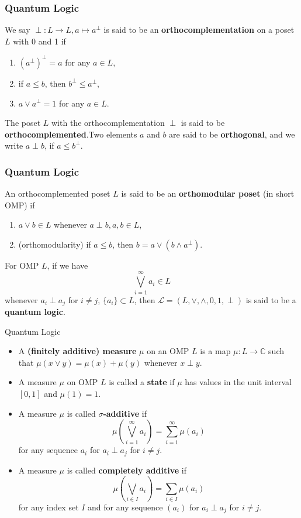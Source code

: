 \documentclass{beamer}
\begin{document}
\begin{frame}
    \frametitle{Quantum Logic}
We say \(\perp: L \to L, a \mapsto a^\perp \) is said to be an \textbf{orthocomplementation} on a poset \(L\) with 0 and 1 if
\begin{enumerate}
    \item \((a^\perp)^\perp = a\) for any \(a \in L\),\pause\\
    \item if \(a \le b\), then \(b^\perp \le a^\perp \),\pause
    \item \(a \vee a^\perp=1\) for any \(a\in L\).\pause
\end{enumerate}
The poset \(L\) with the orthocomplementation \(\perp\) is said to be \textbf{orthocomplemented}.\pause Two elements \(a\) and \(b\) are said to be \textbf{orthogonal}, and we write \(a\perp b\), if \(a\le b^\perp\).


\end{frame}

\begin{frame}
    \frametitle{Quantum Logic}
    An orthocomplemented poset \(L\) is said to be an \textbf{orthomodular poset} (in short OMP) if \pause
\begin{enumerate}
    \item \(a\vee b \in L\) whenever \(a\perp b,a,b \in L\),\pause
    \item (orthomodularity) if \(a\le b\), then \(b=a\vee(b\wedge a^\perp)\).\pause
\end{enumerate}
    For OMP \(L\), if we have
    \[\bigvee^{\infty}_{i=1} a_i \in L\]
    whenever \(a_i \perp a_j\) for \(i \neq j\), \(\{a_i\} \subset L\), then \(\mathcal{L}=(L,\vee,\wedge,0,1,\perp)\) is said to be a \textbf{quantum logic}.
\end{frame}

\begin{frame}{Quantum Logic}
    \begin{itemize}
        \item A \textbf{(finitely additive) measure} \(\mu\) on an OMP \(L\) is a map \(\mu: L \to \mathbb{C}\) such that \(\mu(x\vee y)=\mu(x) + \mu(y)\) whenever \(x \perp y\).\pause
        \item A measure \(\mu\) on OMP \(L\) is called a \textbf{state} if \(\mu\) has values in the unit interval \([0,1]\) and \(\mu(1)=1\).\pause
        \item A measure \(\mu\) is called \textbf{\(\sigma\)-additive} if \[\mu(\bigvee_{i=1}^{\infty}a_i)=\sum_{i=1}^{\infty} \mu(a_i)\] for any sequence \(a_i\) for \(a_i\perp a_j\) for \(i \neq j\).\pause
        \item A measure \(\mu\) is called \textbf{completely additive} if \[\mu(\bigvee_{i \in I} a_i)=\sum_{i\in I} \mu(a_i)\] for any index set \(I\) and for any sequence \((a_i)\) for \(a_i\perp a_j\) for \(i \neq j\).
    \end{itemize}
    
\end{frame}
\end{document}
